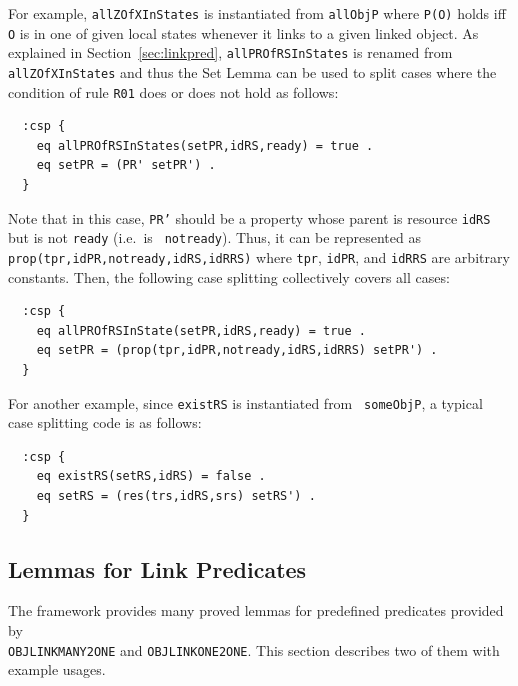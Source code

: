 \documentclass[12pt]{report}
\newcommand{\stt}[1]{{\small{\tt {#1}}}}
\begin{document}
For example, {\tt allZOfXInStates} is instantiated from {\tt allObjP}
where \stt{P(O)} holds iff {\tt O} is in one of given local
states whenever it links to a given linked object.  As explained in
Section~\ref{sec:linkpred}, {\tt allPROfRSInStates} is renamed
from {\tt allZOfXInStates} and thus the Set Lemma can be used to
split cases where the condition of rule {\tt R01} does or does not
hold as follows:
\small
\begin{verbatim}
  :csp {
    eq allPROfRSInStates(setPR,idRS,ready) = true .
    eq setPR = (PR' setPR') .
  }
\end{verbatim}
\normalsize
Note that in this case, {\tt PR'} should be a property whose parent is
resource {\tt idRS} but is not {\tt ready} (i.e.\ is {\tt
  notready}). Thus, it can be represented as
\stt{prop(tpr,idPR,notready,idRS,idRRS)} where {\tt tpr}, {\tt idPR},
and {\tt idRRS} are arbitrary constants. Then, the following case splitting
collectively covers all cases:
\small
\begin{verbatim}
  :csp {
    eq allPROfRSInState(setPR,idRS,ready) = true .
    eq setPR = (prop(tpr,idPR,notready,idRS,idRRS) setPR') .
  }
\end{verbatim}
\normalsize

For another example, since {\tt existRS} is instantiated from {\tt
  someObjP}, a typical case splitting code is as follows:
\small
\begin{verbatim}
  :csp {
    eq existRS(setRS,idRS) = false .
    eq setRS = (res(trs,idRS,srs) setRS') .
  }
\end{verbatim}
\normalsize

\subsection{Lemmas for Link Predicates}
\label{sec:linklemma}
The framework provides many proved lemmas for predefined predicates
provided by\\ {\tt OBJLINKMANY2ONE} and {\tt OBJLINKONE2ONE}. This
section describes two of them with example usages.
\end{document}
